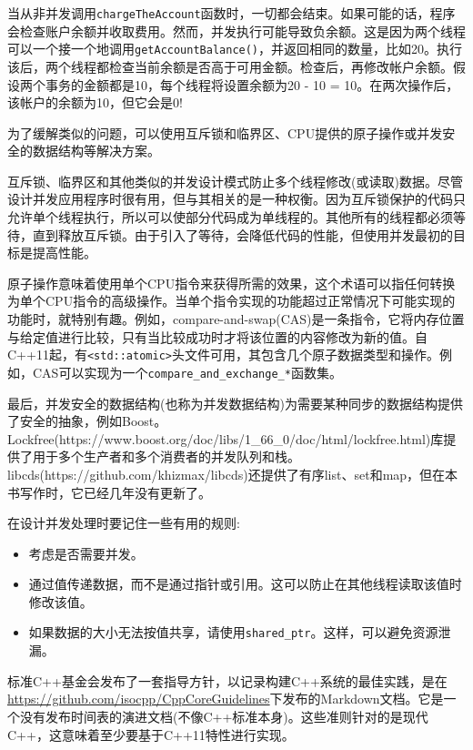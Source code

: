 当从非并发调用\texttt{chargeTheAccount}函数时，一切都会结束。如果可能的话，程序会检查账户余额并收取费用。然而，并发执行可能导致负余额。这是因为两个线程可以一个接一个地调用\texttt{getAccountBalance()}，并返回相同的数量，比如20。执行该后，两个线程都检查当前余额是否高于可用金额。检查后，再修改帐户余额。假设两个事务的金额都是10，每个线程将设置余额为20 - 10 = 10。在两次操作后，该帐户的余额为10，但它会是0!

为了缓解类似的问题，可以使用互斥锁和临界区、CPU提供的原子操作或并发安全的数据结构等解决方案。

互斥锁、临界区和其他类似的并发设计模式防止多个线程修改(或读取)数据。尽管设计并发应用程序时很有用，但与其相关的是一种权衡。因为互斥锁保护的代码只允许单个线程执行，所以可以使部分代码成为单线程的。其他所有的线程都必须等待，直到释放互斥锁。由于引入了等待，会降低代码的性能，但使用并发最初的目标是提高性能。

原子操作意味着使用单个CPU指令来获得所需的效果，这个术语可以指任何转换为单个CPU指令的高级操作。当单个指令实现的功能超过正常情况下可能实现的功能时，就特别有趣。例如，compare-and-swap(CAS)是一条指令，它将内存位置与给定值进行比较，只有当比较成功时才将该位置的内容修改为新的值。自C++11起，有\texttt{<std::atomic>}头文件可用，其包含几个原子数据类型和操作。例如，CAS可以实现为一个\texttt{compare\_and\_exchange\_*}函数集。

最后，并发安全的数据结构(也称为并发数据结构)为需要某种同步的数据结构提供了安全的抽象，例如Boost。Lockfree(https://www.boost.org/doc/libs/1\_66\_0/doc/html/lockfree.html)库提供了用于多个生产者和多个消费者的并发队列和栈。 libcds(https://github.com/khizmax/libcds)还提供了有序list、set和map，但在本书写作时，它已经几年没有更新了。

在设计并发处理时要记住一些有用的规则:

\begin{itemize}
\item 
考虑是否需要并发。

\item 
通过值传递数据，而不是通过指针或引用。这可以防止在其他线程读取该值时修改该值。

\item 
如果数据的大小无法按值共享，请使用\texttt{shared\_ptr}。这样，可以避免资源泄漏。
\end{itemize}


标准C++基金会发布了一套指导方针，以记录构建C++系统的最佳实践，是在\url{https://github.com/isocpp/CppCoreGuidelines}下发布的Markdown文档。它是一个没有发布时间表的演进文档(不像C++标准本身)。这些准则针对的是现代C++，这意味着至少要基于C++11特性进行实现。

